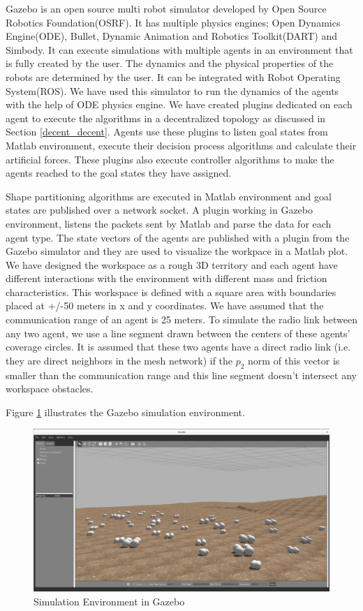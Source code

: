 Gazebo is an open source multi robot simulator developed by Open Source Robotics Foundation(OSRF). It has multiple physics engines; Open Dynamics Engine(ODE), Bullet, Dynamic Animation and Robotics Toolkit(DART) and Simbody. It can execute simulations with multiple agents in an environment that is fully created by the user. The dynamics and the physical properties of the robots are determined by the user. It can be integrated with Robot Operating System(ROS). We have used this simulator to run the dynamics of the agents with the help of ODE physics engine. We have created plugins dedicated on each agent to execute the algorithms in a decentralized topology as discussed in Section \ref{decent_decent}. Agents use these plugins to  listen goal states from Matlab environment, execute their decision process algorithms and calculate their artificial forces. These plugins also execute controller algorithms to make the agents reached to the goal states they have assigned.
 
Shape partitioning algorithms are executed in Matlab environment and goal states are published over a network socket. A plugin working in Gazebo environment, listens the packets sent by Matlab and parse the data for each agent type. The state vectors of the agents are published with a plugin from the Gazebo simulator and they are used to visualize the workpace in a Matlab plot. We have designed the workspace as a rough 3D territory and each agent have different interactions with the environment with different mass and friction characteristics. This workspace is defined with a square area with boundaries placed at +/-50 meters in x and y coordinates. We have assumed that the communication range of an agent is 25 meters. To simulate the radio link between any two agent, we use a line segment drawn between the centers of these agents' coverage circles. It is assumed that these two agents have a direct radio link (i.e. they are direct neighbors in the mesh network) if the $p_2$ norm of this vector is smaller than the communication range and this line segment doesn't intersect any workspace obstacles.

Figure \ref{Gazebo} illustrates the Gazebo simulation environment. 

\begin{figure}[H]
\caption{Simulation Environment in Gazebo} \label{Gazebo}
\centerline{\includegraphics[scale = 0.22]{gazebo_env}}
\end{figure} 

